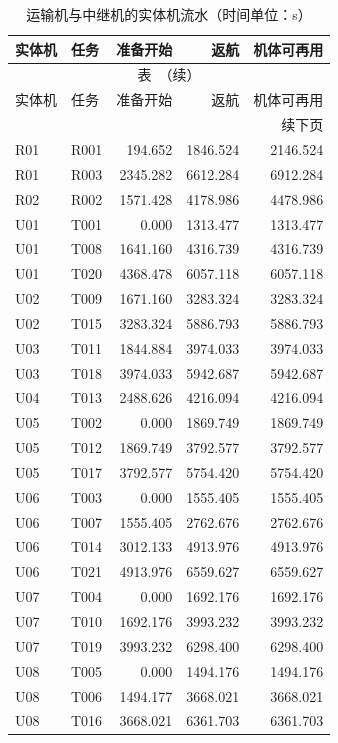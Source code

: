 \begingroup
\small
\setlength{\tabcolsep}{3pt}
\renewcommand{\arraystretch}{1.10}
\begin{longtable}{@{}llrrr@{}}
\caption{运输机与中继机的实体机流水（时间单位：s）}\label{tab:q3-units}\\
\toprule
实体机 & 任务 & 准备开始 & 返航 & 机体可再用 \\
\midrule
\endfirsthead
\multicolumn{5}{c}{\small 表~\thetable{}（续）}\\
\toprule
实体机 & 任务 & 准备开始 & 返航 & 机体可再用 \\
\midrule
\endhead
\midrule
\multicolumn{5}{r}{\small 续下页}\\
\endfoot
\bottomrule
\endlastfoot
R01 & R001 & 194.652 & 1846.524 & 2146.524 \\
R01 & R003 & 2345.282 & 6612.284 & 6912.284 \\
R02 & R002 & 1571.428 & 4178.986 & 4478.986 \\
U01 & T001 & 0.000 & 1313.477 & 1313.477 \\
U01 & T008 & 1641.160 & 4316.739 & 4316.739 \\
U01 & T020 & 4368.478 & 6057.118 & 6057.118 \\
U02 & T009 & 1671.160 & 3283.324 & 3283.324 \\
U02 & T015 & 3283.324 & 5886.793 & 5886.793 \\
U03 & T011 & 1844.884 & 3974.033 & 3974.033 \\
U03 & T018 & 3974.033 & 5942.687 & 5942.687 \\
U04 & T013 & 2488.626 & 4216.094 & 4216.094 \\
U05 & T002 & 0.000 & 1869.749 & 1869.749 \\
U05 & T012 & 1869.749 & 3792.577 & 3792.577 \\
U05 & T017 & 3792.577 & 5754.420 & 5754.420 \\
U06 & T003 & 0.000 & 1555.405 & 1555.405 \\
U06 & T007 & 1555.405 & 2762.676 & 2762.676 \\
U06 & T014 & 3012.133 & 4913.976 & 4913.976 \\
U06 & T021 & 4913.976 & 6559.627 & 6559.627 \\
U07 & T004 & 0.000 & 1692.176 & 1692.176 \\
U07 & T010 & 1692.176 & 3993.232 & 3993.232 \\
U07 & T019 & 3993.232 & 6298.400 & 6298.400 \\
U08 & T005 & 0.000 & 1494.176 & 1494.176 \\
U08 & T006 & 1494.177 & 3668.021 & 3668.021 \\
U08 & T016 & 3668.021 & 6361.703 & 6361.703 \\
\end{longtable}
\endgroup
